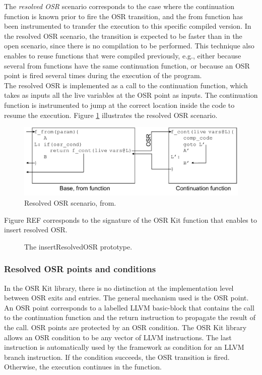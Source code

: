 The \textit{resolved OSR} scenario corresponds to the case where the continuation function is known prior to fire the OSR transition, and the from function has been instrumented to transfer the execution to this specific compiled version.
In the resolved OSR scenario, the transition is expected to be faster than in the open scenario, since there is no compilation to be performed. 
This technique also enables to reuse functions that were compiled previously, e.g., either because several from functions have the same continuation function, or because an OSR point is fired several times during the execution of the program.\\

The resolved OSR is implemented as a call to the continuation function, which takes as inputs all the live variables at the OSR point as inputs.
The continuation function is instrumented to jump at the correct location inside the code to resume the execution. 
Figure \ref{ResolvedOSRFig} illustrates the resolved OSR scenario.\\

\begin{figure}[h]
\centering
\includegraphics[scale=0.5]{Figures/OSRKitResolvedScenario}
\decoRule
\caption[Resolved OSR Scenario]{Resolved OSR scenario, from\cite{OSRKit}.}
\label{ResolvedOSRFig}
\end{figure}

Figure REF corresponds to the signature of the OSR Kit function that enables to insert resolved OSR.\\

\begin{figure}[h]
\caption{The insertResolvedOSR prototype.}
\label{fig:insertresolvedosr}
\end{figure}

\subsubsection{Resolved OSR points and conditions}
In the OSR Kit library\cite{OSRKit}, there is no distinction at the implementation level between OSR exits and entries.
The general mechanism used is the OSR point.
An OSR point corresponds to a labelled LLVM basic-block that contains the call to the continuation function and the return instruction to propagate the result of the call.
OSR points are protected by an OSR condition. 
The OSR Kit library allows an OSR condition to be any vector of LLVM instructions. 
The last instruction is automatically used by the framework as condition for an LLVM branch instruction. 
If the condition succeeds, the OSR transition is fired.
Otherwise, the execution continues in the function.\\


